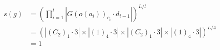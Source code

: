 \documentclass[preview]{standalone}
\begin{document}
\begin{align*}
s(g) &= \left(\prod_{i=1}^{l}\left|G(o(a_i))_{c_i}\cdot d_{i-1}\right|\right)^{L/l} \\   &= \left(\left|(C_2)_1\cdot 3\right| \times \left|(1)_4\cdot 3\right|\times \left|(C_2)_1\cdot 3\right| \times \left|(1)_4\cdot 3\right|\right)^{L/4} \\   &= 1
\end{align*}
\end{document}
